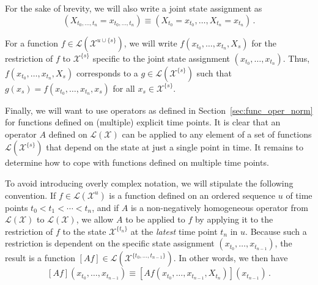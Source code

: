 \documentclass[10pt]{paper}
\theoremstyle{definition}
\newcommand{\states}{\mathcal{X}}
\newcommand{\gambles}{\mathcal{L}}
\newcommand{\gamblesX}{\gambles(\states)}
\begin{document}
For the sake of brevity, we will also write a joint state assignment as
\begin{equation*}
\left(X_{t_0,\ldots,t_n}=x_{t_0,\ldots,t_n}\right)\equiv (X_{t_0}=x_{t_0},\ldots,X_{t_n}=x_{t_n})\,.
\end{equation*}

For a function $f\in\gambles(\states^{u\cup\{s\}})$, we will write $f(x_{t_0},\ldots,x_{t_n},X_s)$ for the restriction of $f$ to $\states^{\{s\}}$ specific to the joint state assignment $(x_{t_0},\ldots,x_{t_n})$. Thus, $f(x_{t_0},\ldots,x_{t_n},X_s)$ corresponds to a $g\in\gambles(\states^{\{s\}})$ such that $g(x_s) = f(x_{t_0},\ldots,x_{t_n},x_s)$ for all $x_s\in\states^{\{s\}}$.

Finally, we will want to use operators as defined in Section~\ref{sec:func_oper_norm} for functions defined on (multiple) explicit time points. It is clear that an operator $A$ defined on $\gamblesX$ can be applied to any element of a set of functions $\gambles(\states^{\{s\}})$ that depend on the state at just a single point in time. It remains to determine how to cope with functions defined on multiple time points. 

To avoid introducing overly complex notation, we will stipulate the following convention. If $f\in\gambles(\states^u)$ is a function defined on an ordered sequence $u$ of time points $t_0<t_1<\cdots<t_n$, and if $A$ is a non-negatively homogeneous operator from $\gamblesX$ to $\gamblesX$, we allow $A$ to be applied to $f$ by applying it to the restriction of $f$ to the state $\states^{\{t_n\}}$ at the \emph{latest} time point $t_n$ in $u$. Because such a restriction is dependent on the specific state assignment $(x_{t_0},\ldots,x_{t_{n-1}})$, the result is a function $[Af]\in\gambles(\states^{\{t_0,\ldots,t_{n-1}\}})$. In other words, we then have
\begin{equation*}
\left[Af\right](x_{t_0},\ldots,x_{t_{n-1}}) \equiv \left[A f(x_{t_0},\ldots,x_{t_{n-1}},X_{t_n})\right](x_{t_{n-1}})\,.
\end{equation*}

\end{document}
